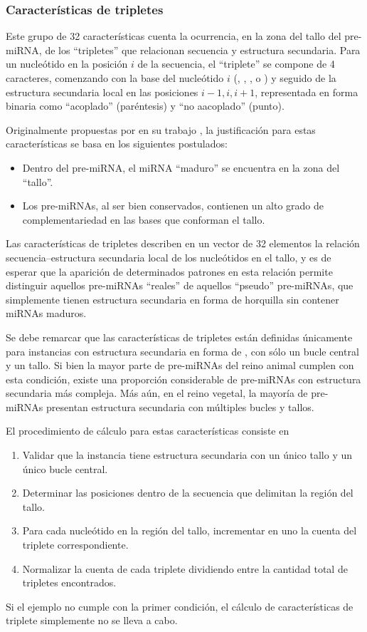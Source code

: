 %
%
\subsubsection{Características de tripletes}
%
Este grupo de 32 características cuenta la ocurrencia, en la zona del
tallo del pre-miRNA, de los ``tripletes'' que relacionan secuencia y
estructura secundaria. Para un nucleótido en la posición $i$ de la
secuencia, el ``triplete'' se compone de 4 caracteres, comenzando con
la base del nucleótido $i$ (\ntA, \ntC, \ntG, o \ntU) y seguido de la
estructura secundaria local en las posiciones $i-1,i,i+1$,
representada en forma binaria como ``acoplado'' \pairL (paréntesis) y
``no aacoplado'' \noPair (punto).

Originalmente propuestas por \citeauthor{xue} en su trabajo
\cite{xue}, la justificación para estas características se basa en los
siguientes postulados:
%
\begin{itemize}
\item Dentro del pre-miRNA, el miRNA ``maduro'' se encuentra en la
  zona del ``tallo''.
\item Los pre-miRNAs, al ser bien conservados, contienen un alto grado
  de complementariedad en las bases que conforman el tallo.
\end{itemize}
%
Las características de tripletes describen en un vector de 32
elementos la relación secuencia--estructura secundaria local de los
nucleótidos en el tallo, y es de esperar que la aparición de
determinados patrones en esta relación permite distinguir aquellos
pre-miRNAs ``reales'' de aquellos ``pseudo'' pre-miRNAs, que
simplemente tienen estructura secundaria en forma de horquilla sin
contener miRNAs maduros.

Se debe remarcar que las características de tripletes están definidas
únicamente para instancias con estructura secundaria en forma de
, con sólo un bucle central y un tallo.  Si bien la mayor
parte de pre-miRNAs del reino animal cumplen con esta condición,
existe una proporción considerable de pre-miRNAs con estructura
secundaria más compleja. Más aún, en el reino vegetal, la mayoría de
pre-miRNAs presentan estructura secundaria con múltiples bucles y
tallos.

El procedimiento de cálculo para estas características consiste en
%
\begin{enumerate}
\item Validar que la instancia tiene estructura secundaria con un
  único tallo y un único bucle central.
\item Determinar las posiciones dentro de la secuencia que delimitan
  la región del tallo.
\item Para cada nucleótido en la región del tallo, incrementar en uno
  la cuenta del triplete correspondiente.
\item Normalizar la cuenta de cada triplete dividiendo entre la
  cantidad total de tripletes encontrados.
\end{enumerate}
%
Si el ejemplo no cumple con la primer condición, el cálculo de
características de triplete simplemente no se lleva a cabo.
